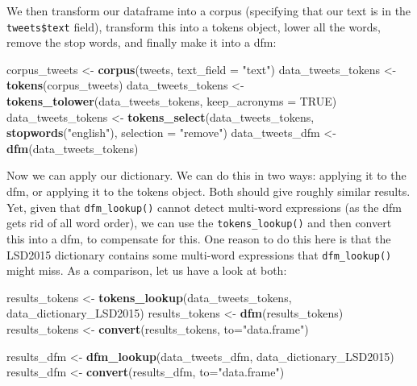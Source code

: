 \documentclass[
]{book}
\newenvironment{Shaded}{\begin{snugshade}}{\end{snugshade}}
\newcommand{\AttributeTok}[1]{\textcolor[rgb]{0.13,0.29,0.53}{#1}}
\newcommand{\ConstantTok}[1]{\textcolor[rgb]{0.56,0.35,0.01}{#1}}
\newcommand{\FunctionTok}[1]{\textcolor[rgb]{0.13,0.29,0.53}{\textbf{#1}}}
\newcommand{\NormalTok}[1]{#1}
\newcommand{\OtherTok}[1]{\textcolor[rgb]{0.56,0.35,0.01}{#1}}
\newcommand{\StringTok}[1]{\textcolor[rgb]{0.31,0.60,0.02}{#1}}
\begin{document}
We then transform our dataframe into a corpus (specifying that our text is in the \texttt{tweets\$text} field), transform this into a tokens object, lower all the words, remove the stop words, and finally make it into a dfm:

\begin{Shaded}
\begin{Highlighting}[]
\NormalTok{corpus\_tweets }\OtherTok{\textless{}{-}} \FunctionTok{corpus}\NormalTok{(tweets, }\AttributeTok{text\_field =} \StringTok{"text"}\NormalTok{)}
\NormalTok{data\_tweets\_tokens }\OtherTok{\textless{}{-}} \FunctionTok{tokens}\NormalTok{(corpus\_tweets)}
\NormalTok{data\_tweets\_tokens }\OtherTok{\textless{}{-}} \FunctionTok{tokens\_tolower}\NormalTok{(data\_tweets\_tokens, }\AttributeTok{keep\_acronyms =} \ConstantTok{TRUE}\NormalTok{)}
\NormalTok{data\_tweets\_tokens }\OtherTok{\textless{}{-}} \FunctionTok{tokens\_select}\NormalTok{(data\_tweets\_tokens, }\FunctionTok{stopwords}\NormalTok{(}\StringTok{"english"}\NormalTok{), }\AttributeTok{selection =} \StringTok{"remove"}\NormalTok{)}
\NormalTok{data\_tweets\_dfm }\OtherTok{\textless{}{-}} \FunctionTok{dfm}\NormalTok{(data\_tweets\_tokens)}
\end{Highlighting}
\end{Shaded}

Now we can apply our dictionary. We can do this in two ways: applying it to the dfm, or applying it to the tokens object. Both should give roughly similar results. Yet, given that \texttt{dfm\_lookup()} cannot detect multi-word expressions (as the dfm gets rid of all word order), we can use the \texttt{tokens\_lookup()} and then convert this into a dfm, to compensate for this. One reason to do this here is that the LSD2015 dictionary contains some multi-word expressions that \texttt{dfm\_lookup()} might miss. As a comparison, let us have a look at both:

\begin{Shaded}
\begin{Highlighting}[]
\NormalTok{results\_tokens }\OtherTok{\textless{}{-}} \FunctionTok{tokens\_lookup}\NormalTok{(data\_tweets\_tokens, data\_dictionary\_LSD2015)}
\NormalTok{results\_tokens }\OtherTok{\textless{}{-}} \FunctionTok{dfm}\NormalTok{(results\_tokens)}
\NormalTok{results\_tokens }\OtherTok{\textless{}{-}} \FunctionTok{convert}\NormalTok{(results\_tokens, }\AttributeTok{to=}\StringTok{"data.frame"}\NormalTok{)}

\NormalTok{results\_dfm }\OtherTok{\textless{}{-}} \FunctionTok{dfm\_lookup}\NormalTok{(data\_tweets\_dfm, data\_dictionary\_LSD2015)}
\NormalTok{results\_dfm }\OtherTok{\textless{}{-}} \FunctionTok{convert}\NormalTok{(results\_dfm, }\AttributeTok{to=}\StringTok{"data.frame"}\NormalTok{)}
\end{Highlighting}
\end{Shaded}
\end{document}
